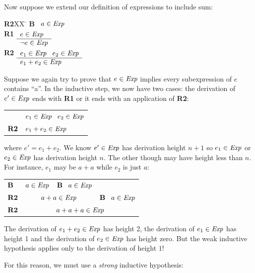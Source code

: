 \documentclass[12pt]{article}
\newcommand{\id}[1]{\mbox{\it #1\/}}
\newcommand{\bid}[1]{\mbox{\bf #1}}
\begin{document}
Now suppose we extend our definition of expressions to include sum:
\begin{tabbing}
{\bf R2}XX \=  \kill
{\bf B} \>
	\(\begin{array}[t]{l}
	a\in\id{Exp}
	\end{array}\) \\[2ex]
{\bf R1} \>
	\(\begin{array}[t]{l}
	e\in\id{Exp} \\
	\hline
	\neg e\in\id{Exp}
	\end{array}\) \\[2ex]
{\bf R2} \>
	\(\begin{array}[t]{l}
	e_1\in\id{Exp}\;\;\;e_2\in\id{Exp} \\
	\hline
	e_1 + e_2\in\id{Exp}
	\end{array}\) %
\end{tabbing}
Suppose we again try to prove that $e\in\id{Exp}$ implies every subexpression of $e$ contains ``a''.
In the inductive step, we now have two cases:
the derivation of $e'\in\id{Exp}$ ends with {\bf R1} or it ends with an application of {\bf R2}:
\begin{center}
\begin{tabular}{ll}
 & $e_1\in\id{Exp}\;\;\; e_2\in\id{Exp}$ \\ \cline{2-2}
$\bid{R2}$ & $e_1+e_2\in\id{Exp}$ 
\end{tabular}
\end{center}
where $e' = e_1 + e_2$.
We know $e'\in\id{Exp}$ has derivation height $n+1$ so $e_1\in\id{Exp}$ or $e_2\in\id{Exp}$ 
has derivation height $n$.
The other though may have height less than $n$.
For instance, $e_1$ may be $a+a$ while $e_2$ is just $a$:
\begin{center}
\begin{tabular}{llll}
$\bid{B}$ & $a\in\id{Exp}$ & $\bid{B}\;\;\;a\in\id{Exp}$ \\ \cline{2-3}
$\bid{R2}$ & \multicolumn{2}{c}{$a+a\in\id{Exp}$} & $\bid{B}\;\;\;a\in\id{Exp}$ \\ \cline{2-4}
$\bid{R2}$ & \multicolumn{3}{c}{$a+a+a\in\id{Exp}$} 
\end{tabular}
\end{center}
The derivation of $e_1+e_2\in\id{Exp}$ has height 2, 
the derivation of $e_1\in\id{Exp}$ has height 1 and the derivation of
$e_2\in\id{Exp}$ has height zero.
But the weak inductive hypothesis applies only to the derivation of height $1$!

For this reason, we must use a {\em strong\/} inductive hypothesis:
\end{document}
